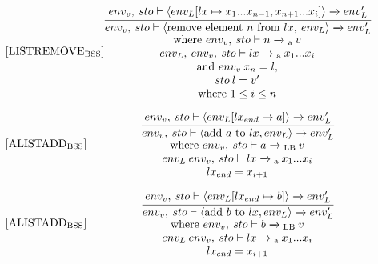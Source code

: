 \begin{equation}
\begin{minipage}{.2\linewidth}
$[\text{LISTREMOVE}_\text{BSS}]$
\end{minipage}
\begin{minipage}{.8\linewidth}
\centering
$\cfrac{env_v, \: sto\vdash \langle env_L[lx \mapsto x_1...x_{n-1}, x_{n+1}...x_i]\rangle \xrightarrow{} env_L'}{env_v, \: sto \vdash \langle \text{remove element } n \text{ from } lx, \: env_L \rangle \xrightarrow{} env_L'}$
\\
where $env_v, \: sto \vdash n \xrightarrow{}\textsubscript{a} \: v$
\\
$env_L, \: env_v, \: sto \vdash lx \xrightarrow{}\textsubscript{a} \: x_1...x_i$ 
\\ 
and $env_v \: x_n = l$, \\$sto \: l = v'$
\\
where $1 \leq i \leq n$
\end{minipage}
\end{equation}

\begin{equation}
\begin{minipage}{.2\linewidth}
$[\text{ALISTADD}_\text{BSS}]$
\end{minipage}
\begin{minipage}{.8\linewidth}
\centering
$\cfrac{env_v, \: sto \vdash \langle env_L[lx_{end} \mapsto a ] \rangle \xrightarrow{} env_L'}{env_v, \: sto \vdash \langle \text{add } a \text{ to } lx, env_L \rangle \xrightarrow{} env_L'}$
\\
where $env_v, \: sto \vdash a \xrightarrow{}\textsubscript{LB} \: v$
\\
$env_L \: env_v, \: sto \vdash lx \xrightarrow{}\textsubscript{a} \: x_1...x_i$
\\
$lx_ {end} = x_{i+1}$
\end{minipage}
\end{equation}

\begin{equation}
\begin{minipage}{.2\linewidth}
$[\text{ALISTADD}_\text{BSS}]$
\end{minipage}
\begin{minipage}{.8\linewidth}
\centering
$\cfrac{env_v, \: sto \vdash \langle env_L[lx_{end} \mapsto b ] \rangle \xrightarrow{} env_L'}{env_v, \: sto \vdash \langle \text{add } b \text{ to } lx, env_L \rangle \xrightarrow{} env_L'}$
\\
where $env_v, \: sto \vdash b \xrightarrow{}\textsubscript{LB} \: v$
\\
$env_L \: env_v, \: sto \vdash lx \xrightarrow{}\textsubscript{a} \: x_1...x_i$
\\
$lx_ {end} = x_{i+1}$
\end{minipage}
\end{equation}

